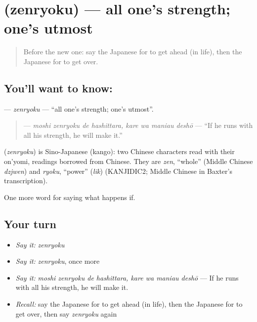 \section[\texorpdfstring{\ja{ぜんりょく} (zenryoku)}{ぜんりょく (zenryoku)}]{ (zenryoku) — all one's strength; one's utmost}

\label{lesson:JA-C516-zenryoku}



\begin{quote}
Before the new one: say the Japanese for to get ahead (in life), then the Japanese for to get over.
\end{quote}

\subsection*{You'll want to know: }
\textbf{} — \emph{zenryoku} — \textquotedblleft{}all one's strength; one's utmost\textquotedblright{}.

\begin{quote}
\textbf{   } — \emph{moshi zenryoku de hashittara, kare wa maniau deshō} — \textquotedblleft{}If he runs with all his strength, he will make it.\textquotedblright{}
\end{quote}

\begin{cousinweb}
\textbf{} (\emph{zenryoku}) is Sino-Japanese (kango): two Chinese characters read with their on'yomi, readings borrowed from Chinese. They are \emph{zen}, \textquotedblleft{}whole\textquotedblright{} (Middle Chinese \emph{dzjwen}) and \emph{ryoku}, \textquotedblleft{}power\textquotedblright{} (\emph{lik}) (KANJIDIC2; Middle Chinese in Baxter's transcription).
\end{cousinweb}

\begin{grammarlens}[title={What you've built}]
One more word for saying what happens if.
\end{grammarlens}

\subsection*{Your turn}
\begin{itemize}
\raggedright
  \item \emph{Say it:} \emph{zenryoku}
  \item \emph{Say it:} \emph{zenryoku}, once more
  \item \emph{Say it:} \emph{moshi zenryoku de hashittara, kare wa maniau deshō} — If he runs with all his strength, he will make it.
  \item \emph{Recall:} say the Japanese for to get ahead (in life), then the Japanese for to get over, then say \emph{zenryoku} again
\end{itemize}

